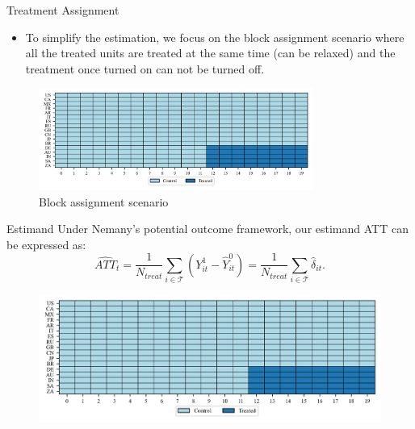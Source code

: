 \documentclass{beamer}
\begin{document}
\begin{frame}{Treatment Assignment}
\begin{itemize}
    \item To simplify the estimation, we focus on the block assignment scenario where all the treated units are treated at the same time 
    (can be relaxed) and the treatment once turned on can not be turned off.
\end{itemize}
\begin{figure}
    \centering
    \includegraphics[width=0.8\textwidth]{figs/block_assignment.png}
    \caption{Block assignment scenario}
\end{figure}
\end{frame}

\begin{frame}{Estimand}
Under Nemany's potential outcome framework, our estimand ATT can be expressed as:
\begin{equation*}
    \widehat{ATT}_{t} = \frac{1}{N_{treat}}\sum_{i \in \mathcal{T}} \left( Y_{it}^1 - \hat{Y}_{it}^0 \right) = \frac{1}{N_{treat}}\sum_{i \in \mathcal{T}}\hat{\delta}_{it}.
\end{equation*}

\begin{figure}
    \centering
    \includegraphics[scale=0.5]{figs/block_assignment.png}
\end{figure}
\end{frame}
\end{document}
